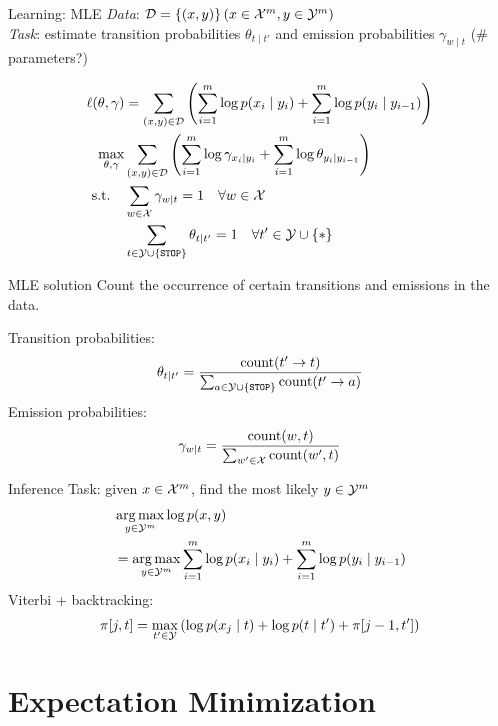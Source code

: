 \documentclass[usenames,dvipsnames,notes]{beamer}
\begin{document}
\begin{frame}
    {Learning: MLE}
    \emph{Data}: $\mathcal{D} = \left\{ (x,y) \right\} (x\in\mathcal{X}^m, y\in\mathcal{Y}^m)$\\
    \emph{Task}: estimate transition probabilities $\theta_{t\mid t'}$ and emission probabilities $\gamma_{w\mid t}$  (\# parameters?)

    \begin{align*}
        \ell(\theta,\gamma) &= \sum_{(x,y)\in\mathcal{D}} \left( 
            \sum_{i=1}^m \log p(x_i\mid y_i) +
            \sum_{i=1}^m \log p(y_i\mid y_{i-1})  \right) \\
        \max_{\theta,\gamma} & \sum_{(x,y)\in\mathcal{D}} \left( 
            \sum_{i=1}^m \log \gamma_{x_i\mid y_i} +
            \sum_{i=1}^m \log \theta_{y_i\mid y_{i-1}}
         \right)\\
        \text{s.t.} \quad & \sum_{w\in\mathcal{X}} \gamma_{w\mid t} = 1 \quad \forall w\in\mathcal{X} \\
        \quad & \sum_{t\in\mathcal{Y}\cup\left\{ \texttt{STOP} \right\}} \theta_{t\mid t'} = 1 \quad \forall t'\in\mathcal{Y}\cup\left\{ * \right\}
    \end{align*}
\end{frame}

\begin{frame}
    {MLE solution}
    Count the occurrence of certain transitions and emissions in the data.

    Transition probabilities:
    $$
    \theta_{t\mid t'} = \frac{\text{count}(t'\rightarrow t)}
    {\sum_{a\in\mathcal{Y}\cup\left\{ \texttt{STOP} \right\}}\text{count}(t'\rightarrow a)}
    $$
    Emission probabilities:
    $$
    \gamma_{w\mid t} = \frac{\text{count}(w,t)}
    {\sum_{w'\in\mathcal{X}}\text{count}(w',t)}
    $$

    \vspace{3em}
\end{frame}

\begin{frame}
    {Inference}
    Task: given $x\in\mathcal{X}^m$, find the most likely $y\in\mathcal{Y}^m$
    \begin{align*}
        &\operatorname*{arg\,max}_{y\in\mathcal{Y}^m} \log p(x,y) \\
        &= \operatorname*{arg\,max}_{y\in\mathcal{Y}^m} \sum_{i=1}^m \log p(x_i\mid y_i)
        + \sum_{i=1}^m \log p(y_i\mid y_{i-1})
    \end{align*}
    Viterbi + backtracking:
    $$
    \pi[j, t] = \max_{t'\in\mathcal{Y}}\left(  \log p(x_j\mid t) + \log p(t\mid t') + \pi[j-1, t']  \right)
    $$
\end{frame}

\section{Expectation Minimization}
\end{document}
